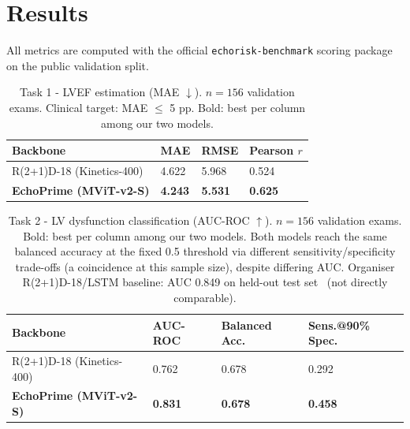 \documentclass[runningheads]{llncs}
\begin{document}

\section{Results}

All metrics are computed with the official \texttt{echorisk-benchmark} scoring package on the public validation split.

\begin{table}[t]
\caption{Task 1 - LVEF estimation (MAE $\downarrow$). $n=156$ validation exams. Clinical target: MAE $\le$ 5 pp. Bold: best per column among our two models.}\label{tab:task1}
\centering
\begin{tabular}{llll}
\toprule
Backbone & MAE & RMSE & Pearson $r$ \\
\midrule
R(2+1)D-18 (Kinetics-400) & 4.622 & 5.968 & 0.524 \\
\textbf{EchoPrime (MViT-v2-S)} & \textbf{4.243} & \textbf{5.531} & \textbf{0.625} \\
\bottomrule
\end{tabular}
\end{table}

\begin{table}[t]
\caption{Task 2 - LV dysfunction classification (AUC-ROC $\uparrow$). $n=156$ validation exams. Bold: best per column among our two models. Both models reach the same balanced accuracy at the fixed 0.5 threshold via different sensitivity/specificity trade-offs (a coincidence at this sample size), despite differing AUC. Organiser R(2+1)D-18/LSTM baseline: AUC 0.849 on held-out test set~\cite{ref_echorisk} (not directly comparable).}\label{tab:task2}
\centering
\begin{tabular}{llll}
\toprule
Backbone & AUC-ROC & Balanced Acc. & Sens.@90\%\,Spec. \\
\midrule
R(2+1)D-18 (Kinetics-400) & 0.762 & 0.678 & 0.292 \\
\textbf{EchoPrime (MViT-v2-S)} & \textbf{0.831} & \textbf{0.678} & \textbf{0.458} \\
\bottomrule
\end{tabular}
\end{table}
\end{document}
